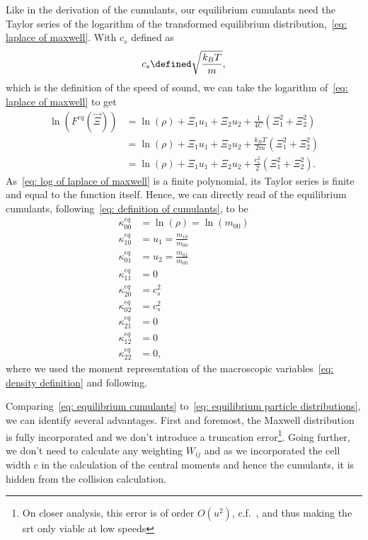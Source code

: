 
Like in the derivation of the cumulants, our equilibrium cumulants need the Taylor series of the logarithm of the transformed equilibrium distribution,~\eqref{eq: laplace of maxwell}.
With $c_s$ defined as
\begin{equation}
  c_s \defined \sqrt{\frac{k_B T}{m}},
\end{equation}
which is the definition of the speed of sound, we can take the logarithm of~\eqref{eq: laplace of maxwell} to get
\begin{equation}
  \label{eq: log of laplace of maxwell}
  \begin{aligned}
    \ln(F^{eq}(\vec{\Xi}))
      & = \ln(\rho) + \Xi_1 u_1 + \Xi_2 u_2 + \frac{1}{4C}\left(\Xi_1^2 + \Xi_2^2 \right) \\
      & = \ln(\rho) + \Xi_1 u_1 + \Xi_2 u_2 + \frac{k_B T}{2m}\left(\Xi_1^2 + \Xi_2^2 \right) \\
      & = \ln(\rho) + \Xi_1 u_1 + \Xi_2 u_2 + \frac{c_s^2}{2}\left(\Xi_1^2 + \Xi_2^2 \right).
  \end{aligned}
\end{equation}
As~\eqref{eq: log of laplace of maxwell} is a finite polynomial, its Taylor series is finite and equal to the function itself.
Hence, we can directly read of the equilibrium cumulants, following~\eqref{eq: definition of cumulants}, to be
\begin{equation}
  \label{eq: equilibrium cumulants}
  \begin{aligned}
    \kappa_{00}^{eq} & = \ln(\rho) = \ln(m_{00}) \\
    \kappa_{10}^{eq} & = u_1 = \frac{m_{10}}{m_{00}} \\
    \kappa_{01}^{eq} & = u_2 = \frac{m_{01}}{m_{00}}\\
    \kappa_{11}^{eq} & = 0 \\
    \kappa_{20}^{eq} & = c_s^2  \\
    \kappa_{02}^{eq} & = c_s^2  \\
    \kappa_{21}^{eq} & = 0 \\
    \kappa_{12}^{eq} & = 0 \\
    \kappa_{22}^{eq} & = 0,
  \end{aligned}
\end{equation}
where we used the moment representation of the macroscopic variables~\eqref{eq: density definition} and following.

Comparing~\eqref{eq: equilibrium cumulants} to~\eqref{eq: equilibrium particle distributions}, we can identify several advantages.
First and foremost, the Maxwell distribution is fully incorporated and we don't introduce a truncation error\footnote{On closer analysis, this error is of order $O(u^2)$, c.f.~\cite[page 178]{wolf2000lattice}, and thus making the \gls{srt} only viable at low speeds}. Going further, we don't need to calculate any weighting $W_{ij}$ and as we incorporated the cell width $c$ in the calculation of the central moments and hence the cumulants, it is hidden from the collision calculation.


